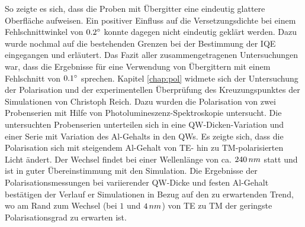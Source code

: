 \newline
So zeigte es sich, dass die Proben mit Übergitter eine eindeutig glattere Oberfläche aufweisen. Ein positiver Einfluss auf die Versetzungsdichte bei einem Fehlschnittwinkel von $0.2 \degree$ konnte dagegen nicht eindeutig geklärt werden. Dazu wurde nochmal auf die bestehenden Grenzen bei der Bestimmung der IQE eingegangen und erläutert. Das Fazit aller zusammengetragenen Untersuchungen war, dass die Ergebnisse für eine Verwendung von Übergittern mit einem Fehlschnitt von $0.1\degree$ sprechen.
\newline
Kapitel \ref{chap:pol} widmete sich der Untersuchung der Polarisation und der experimentellen Überprüfung des Kreuzungspunktes der Simulationen von Christoph Reich. Dazu wurden die Polarisation von zwei Probenserien mit Hilfe von Photolumineszenz-Spektroskopie untersucht. Die untersuchten Probenserien unterteilen sich in eine QW-Dicken-Variation und einer Serie mit Variation des Al-Gehalts in den QWs. 
Es zeigte sich, dass die Polarisation sich mit steigendem Al-Gehalt von TE- hin zu TM-polarisierten Licht ändert. Der Wechsel findet bei einer Wellenlänge von ca. $240 \thinspace nm$ statt und ist in guter Übereinstimmung mit den Simulation.
\newline
Die Ergebnisse der Polarisationsmessungen bei variierender QW-Dicke und festen Al-Gehalt bestätigen der Verlauf er Simulationen in Bezug auf den zu erwartenden Trend, wo am Rand zum Wechsel (bei $1$ und $4 \thinspace nm$) von TE zu TM der geringste Polarisationsgrad zu erwarten ist. 



